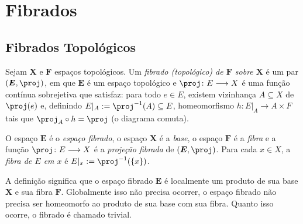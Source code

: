 \chapter{Fibrados}

\section{Fibrados Topológicos}

\begin{defi}
Sejam $\bm X$ e $\bm F$ espaços topológicos. Um \emph{fibrado (topológico) de $\bm F$ sobre $\bm X$} é um par $(\bm E,\proj)$, em que $\bm E$ é um espaço topológico e $\proj\colon E \to X$ é uma função contínua sobrejetiva que satisfaz: para todo $e \in E$, existem vizinhança $A \subseteq X$ de $\proj(e)$ e, definindo $E|_A := \proj\inv(A) \subseteq E$, homeomorfismo $h\colon E|_A \to A \times F$ tais que $\proj_A \circ h = \proj$ (o diagrama comuta).
\begin{figure}
\centering
{}
\end{figure}
O espaço $\bm E$ é o \emph{espaço fibrado}, o espaço $\bm X$ é a \emph{base}, o espaço $\bm F$ é a \emph{fibra} e a função $\proj\colon E \to X$ é a \emph{projeção fibrada} de $(\bm E,\proj)$. Para cada $x \in X$,  a \emph{fibra de $E$ em $x$} é $E|_x := \proj\inv(\{x\})$.
\end{defi}

A definição significa que o espaço fibrado $\bm E$ é localmente um produto de sua base $\bm X$ e sua fibra $\bm F$. Globalmente isso não precisa ocorrer, o espaço fibrado não precisa ser homeomorfo ao produto de sua base com sua fibra. Quanto isso ocorre, o fibrado é chamado trivial.

